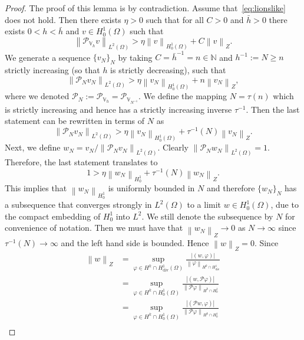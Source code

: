 \documentclass[10pt,letterpaper]{amsart}
\newcommand{\N}{\mathbb{N}}
\newcommand\norm[1]{\left\lVert#1\right\rVert}
\newcommand{\Div}{\operatorname{div}}
\newcommand{\dom}{\Omega}
\newcommand{\Vh}{\mathbb{V}_h}
\newcommand{\PN}{\mathcal{P}_{N}}
\newcommand{\PVh}{\mathcal{P}_{\Vh}}
\newcommand{\Pl}{\mathcal{P}} %
\theoremstyle{definition}{\newtheorem{definition}[lemma]{Definition}}
\numberwithin{equation}{section}
\begin{document}
\begin{proof}
	The proof of this lemma is by contradiction. Assume that~\eqref{eq:lionslike} does not hold. Then there exists $\eta>0$ such that for all $C>0$ and $\bar{h}>0$ there exists $0<h<\bar{h}$ and $v\in H^1_0(\dom)$ such that
	\begin{equation*}
		\norm{\PVh v}_{L^2(\dom)}> \eta \norm{v}_{H^1_0(\dom)} + C \norm{v}_Z.
	\end{equation*}
	We generate a sequence $\{v_N\}_N$ by taking $C=\bar{h}^{-1} =n\in \N$ and $h^{-1}:=N\geq n$ strictly increasing (so that $h$ is strictly decreasing), such that
	\begin{equation*}
		\norm{\PN v_N}_{L^2(\dom)}> \eta \norm{v_N}_{H^1_0(\dom)} + n \norm{v_N}_Z,
	\end{equation*}
	where we denoted $\PN:=\PVh = \mathcal{P}_{\mathbb{V}_{N^{-1}}}$.
	We define the mapping $N = \tau(n)$ which is strictly increasing and hence has a strictly increasing inverse $\tau^{-1}$. Then the last statement can be rewritten in terms of $N$ as
	\begin{equation*}
		\norm{\PN v_N}_{L^2(\dom)}> \eta \norm{v_N}_{H^1_0(\dom)} + \tau^{-1}(N)\norm{v_N}_Z.
	\end{equation*}
	Next, we define $w_N =v_N / \norm{\PN v_N}_{L^2(\dom)}$. Clearly $\norm{\PN w_N}_{L^2(\dom)} = 1$. Therefore, the last statement translates to
	\begin{equation*}
		1>\eta \norm{w_N}_{H^1_0} + \tau^{-1}(N)\norm{w_N}_{Z}.
	\end{equation*}
	This implies that $\norm{w_N}_{H^1_0}$ is uniformly bounded in $N$ and therefore $\{w_N\}_{N}$ has a subsequence that converges strongly in $L^2(\dom)$ to a limit $w\in H^1_0(\dom)$, due to the compact embedding of $H^1_0$ into $L^2$. We still denote the subsequence by $N$ for convenience of notation. Then we must have that $\norm{w_N}_Z\to 0$ as $N\to \infty$ since $\tau^{-1}(N)\to \infty$ and the left hand side is bounded. Hence $\norm{w}_Z = 0$. 
	Since 
	\begin{equation*}
		\begin{split}
			\norm{w}_Z &= \sup_{\varphi \in H^k\cap H^1_{\Div}(\dom)} \frac{|(w,\varphi)|}{\norm{\varphi}_{H^k\cap H_{\Div}^1}} \\
			&= \sup_{\varphi \in H^k\cap H^1_{0}(\dom)} \frac{|(w,\Pl\varphi)|}{\norm{\Pl\varphi}_{H^k\cap H_0^1}}\\
			& = \sup_{\varphi \in H^k\cap H^1_{0}(\dom)} \frac{|(\Pl w,\varphi)|}{\norm{\Pl\varphi}_{H^k\cap H^1_0}} \\

\end{split}
\end{equation*}
\end{proof}
\end{document}
